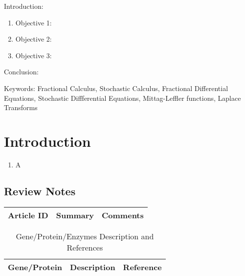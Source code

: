 


\twocolumn
\scriptsize
\begin{frontmatter}
		\title{}
		\author{}
		\address{The Mathematical Learning Space}
\end{frontmatter}	

Introduction:
\begin{enumerate}
\item Objective 1:
\item Objective 2:
\item Objective 3:
\end{enumerate}
Conclusion:

Keywords: Fractional Calculus, Stochastic Calculus, Fractional Differential Equations, Stochastic Diffferential Equations, Mittag-Leffler functions, Laplace Transforms

\section{Introduction}

\begin{enumerate}
	\item A \cite{key1}
\end{enumerate}

\subsection{Review Notes}

\begin{table}[H]\centering
	\begin{tabular}{p{1cm}p{4cm}p{3cm}}
		Article ID & Summary & Comments\\
		\hline
		\hline
	\end{tabular}
\end{table}

\centering	
\begin{table}[H]\tiny
	\caption{Gene/Protein/Enzymes Description and References}	
	\begin{tabular}{r|p{4cm}|l}
		\hline	
		Gene/Protein & Description & Reference \\
		\hline 
		\hline 
	\end{tabular}
\end{table}

